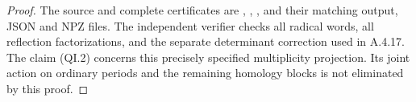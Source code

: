 \begin{proof}
The source and complete certificates are
,
,
,
and their matching output, JSON and NPZ files.
The independent verifier
checks all radical words, all reflection factorizations,
and the separate determinant correction used in A.4.17.
The claim (QI.2) concerns this precisely specified
multiplicity projection.  Its joint action on ordinary
periods and the remaining homology blocks is not
eliminated by this proof.
\end{proof}
